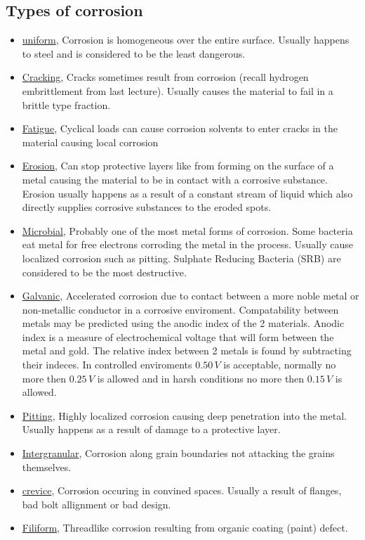 \documentclass[11pt, a4paper]{article}
\begin{document}
\subsection{Types of corrosion}
\begin{itemize}
  \item \underline{uniform}, Corrosion is homogeneous over the entire surface. Usually happens to steel and is considered to be the least dangerous.
  \item \underline{Cracking}, Cracks sometimes result from corrosion (recall hydrogen embrittlement from last lecture). Usually causes the material to fail in a brittle type fraction.
  \item \underline{Fatigue}, Cyclical loads can cause corrosion solvents to enter cracks in the material causing local corrosion
  \item \underline{Erosion}, Can stop protective layers like  from forming on the surface of a metal causing the material to be in contact with a corrosive substance. Erosion usually happens as a result of a constant stream of liquid which also directly supplies corrosive substances to the eroded spots.
  \item \underline{Microbial}, Probably one of the most metal forms of corrosion. Some bacteria eat metal for free electrons corroding the metal in the process. Usually cause localized corrosion such as pitting. Sulphate Reducing Bacteria (SRB) are considered to be the most destructive.
  \item \underline{Galvanic}, Accelerated corrosion due to contact between a more noble metal or non-metallic conductor in a corrosive enviroment. Compatability between metals may be predicted using the anodic index of the 2 materials. Anodic index is a measure of electrochemical voltage that will form between the metal and gold. The relative index between 2 metals is found by subtracting their indeces. In controlled enviroments $0.50\,V$ is acceptable, normally no more then $0.25\,V$ is allowed and in harsh conditions no more then $0.15\, V$ is allowed.
  \item \underline{Pitting}, Highly localized corrosion causing deep penetration into the metal. Usually happens as a result of damage to a protective layer.
  \item \underline{Intergranular}, Corrosion along grain boundaries not attacking the grains themselves.
  \item \underline{crevice}, Corrosion occuring in convined spaces. Usually a result of flanges, bad bolt allignment or bad design.
  \item \underline{Filiform}, Threadlike corrosion resulting from organic coating (paint) defect.
\end{itemize}
\end{document}
